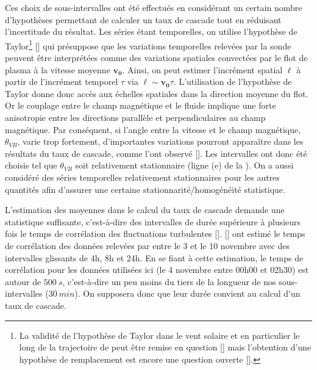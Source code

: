 Ces choix de sous-intervalles ont été effectués en considérant un certain nombre d'hypothèses permettant de calculer un taux de cascade tout en réduisant l'incertitude du résultat. Les séries étant temporelles, on utilise l'hypothèse de Taylor\footnote{La validité de l'hypothèse de Taylor dans le vent solaire et en particulier le long de la trajectoire de  peut être remise en question [\cite{treumann_applicability_2019,chhiber_contextual_2019}] mais l'obtention d'une hypothèse de remplacement est encore une question ouverte [\cite{parashar_observations_2022}].} [\cite{taylor_spectrum_1937}] qui présuppose que les variations temporelles relevées par la sonde peuvent être interprétées comme des variations spatiales convectées par le flot de plasma à la vitesse moyenne $\boldsymbol{v_0}$. Ainsi, on peut estimer l'incrément spatial $\boldsymbol{\ell}$ à partir de l'incrément temporel $\tau $ via $ \boldsymbol{\ell} \sim \boldsymbol{v_0} \tau$. L'utilisation de l'hypothèse de Taylor donne donc accès aux échelles spatiales dans la direction moyenne du flot. Or le couplage entre le champ magnétique et le fluide implique une forte anisotropie entre les directions parallèle et perpendiculaires au champ magnétique. Par conséquent, si l'angle entre la vitesse et le champ magnétique, $\theta_{VB}$, varie trop fortement, d'importantes variations pourront apparaître dans les résultats du taux de cascade, comme l'ont observé [\cite{hadid_energy_2017}]. Les intervalles ont donc été choisis tel que $\theta_{VB}$ soit relativement stationnaire (ligne (e) de la ). On a aussi considéré des séries temporelles relativement stationnaires pour les autres quantités afin d'assurer une certaine stationnarité/homogénéité statistique. 

L'estimation des moyennes dans le calcul du taux de cascade demande une statistique suffisante, c'est-à-dire des intervalles de durée supérieure à plusieurs fois le temps de corrélation des fluctuations turbulentes [\cite{coburn_third-moment_2015}]. 
[\cite{parashar_measures_2020}] ont estimé le temps de corrélation des données relevées par  entre le 3 et le 10 novembre avec des intervalles glissants de 4h, 8h et 24h. En se fiant à cette estimation, le temps de corrélation pour les données utilisées ici (le 4 novembre entre 00h00 et 02h30) est autour de $\SI{500}{s}$, c'est-à-dire un peu moins du tiers de la longueur de nos sous-intervalles ($\SI{30}{min}$). On supposera donc que leur durée convient au calcul d'un taux de cascade. 


